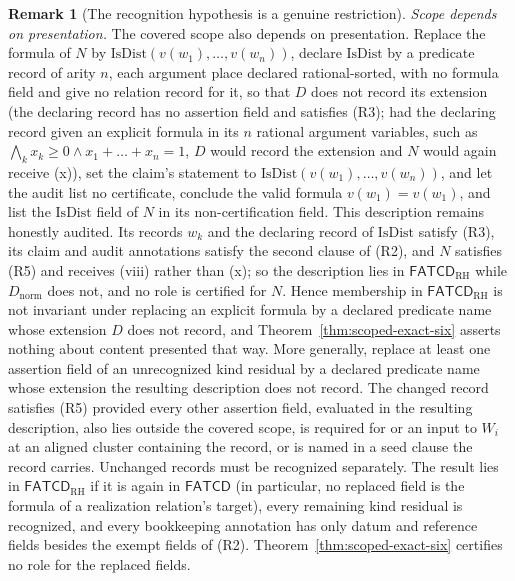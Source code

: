 \documentclass[11pt]{article}
\theoremstyle{definition}
\newtheorem{remark}[theorem]{Remark}
\newcommand{\FATCD}{\ensuremath{\mathsf{FATCD}}}
\begin{document}
\begin{remark}[The recognition hypothesis is a genuine restriction]
\emph{Scope depends on presentation.} The covered scope also depends on presentation. Replace the formula of \(N\)
by \(\mathrm{IsDist}(v(w_1),\ldots,v(w_n))\), declare \(\mathrm{IsDist}\) by a
predicate record of arity \(n\), each argument place declared rational-sorted, with no formula field and give no relation
record for it, so that \(D\) does not record its extension (the declaring
record has no assertion field and satisfies (R3); had the declaring record
given an explicit formula in its \(n\) rational argument variables, such as \(\bigwedge_k x_k\ge0\wedge x_1+\dots+x_n=1\), \(D\) would record the extension and \(N\) would
again receive (x)), set the claim's statement
to \(\mathrm{IsDist}(v(w_1),\ldots,v(w_n))\), and let the audit list no certificate, conclude the valid formula
\(v(w_1)=v(w_1)\), and list the \(\mathrm{IsDist}\) field of \(N\) in its
non-certification field. This description remains honestly
audited. Its records \(w_k\) and the declaring record of \(\mathrm{IsDist}\)
satisfy (R3), its claim and audit annotations satisfy the second clause of
(R2), and \(N\) satisfies (R5) and receives (viii) rather than (x); so the
description lies in \(\FATCD_{\mathrm{RH}}\) while \(D_{\mathrm{norm}}\) does
not, and no role is certified for \(N\). Hence membership in \(\FATCD_{\mathrm{RH}}\) is not
invariant under replacing an explicit formula by a declared predicate name whose extension \(D\) does not record,
and Theorem~\ref{thm:scoped-exact-six} asserts nothing about content presented
that way. More generally, replace at least one assertion field of an unrecognized
kind residual by a declared predicate name whose extension the resulting
description does not record. The changed record satisfies (R5) provided every
other assertion field, evaluated in the resulting description, also lies
outside the covered scope, is required for or an input to \(W_i\) at an
aligned cluster containing the record, or is named in a seed clause the record
carries. Unchanged records must be recognized separately. The result lies in
\(\FATCD_{\mathrm{RH}}\) if it is again in \FATCD{} (in particular, no replaced field is the formula of a realization relation's target),
every remaining kind residual is recognized, and every bookkeeping annotation
has only datum and reference fields besides the exempt fields of (R2).
Theorem~\ref{thm:scoped-exact-six} certifies no role for the replaced
fields.


\end{remark}
\end{document}
